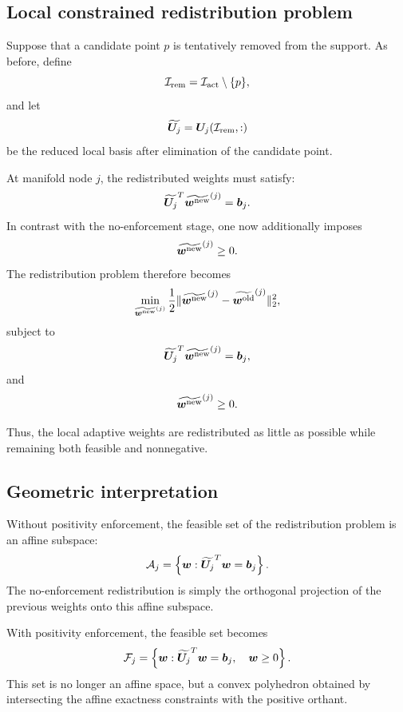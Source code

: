 \documentclass[11pt,a4paper]{article}
\begin{document}
\subsection{Local constrained redistribution problem}

Suppose that a candidate point $p$ is tentatively removed from the support. As
before, define
\[
        \mathcal{I}_{\mathrm{rem}}=\mathcal{I}_{\mathrm{act}}\setminus\{p\},
\]
and let
\[
        \widetilde{\bm U_j}
        =
        \bm U_j(\mathcal{I}_{\mathrm{rem}},:)
\]
be the reduced local basis after elimination of the candidate point.

At manifold node $j$, the redistributed weights must satisfy:
\[
        {\widetilde{\bm U_j}}^T
        \widetilde{\bm w^{\mathrm{new}}}^{(j)}
        =
        \bm b_j.
        \label{eq:local_positive_exactness}
\]
In contrast with the no-enforcement stage, one now additionally imposes
\[
        \widetilde{\bm w^{\mathrm{new}}}^{(j)}\geq 0.
        \label{eq:local_positive_inequality}
\]
The redistribution problem therefore becomes
\[
        \min_{\widetilde{\bm w^{\mathrm{new}}}^{(j)}}
        \frac{1}{2}
        \|
        \widetilde{\bm w^{\mathrm{new}}}^{(j)}
        -
        \widetilde{\bm w^{\mathrm{old}}}^{(j)}
        \|_2^2,
\]
subject to
\[
        {\widetilde{\bm U_j}}^T
        \widetilde{\bm w^{\mathrm{new}}}^{(j)}
        =
        \bm b_j,
\]
and
\[
        \widetilde{\bm w^{\mathrm{new}}}^{(j)}\geq 0.
        \label{eq:local_positive_problem}
\]

Thus, the local adaptive weights are redistributed as little as possible while
remaining both feasible and nonnegative.

\subsection{Geometric interpretation}

Without positivity enforcement, the feasible set of the redistribution problem
is an affine subspace:
\[
        \mathcal{A}_j
        =
        \left\{
        \bm w:
        {\widetilde{\bm U_j}}^T\bm w=\bm b_j
        \right\}.
\]
The no-enforcement redistribution is simply the orthogonal projection of the
previous weights onto this affine subspace.

With positivity enforcement, the feasible set becomes
\[
        \mathcal{F}_j
        =
        \left\{
        \bm w:
        {\widetilde{\bm U_j}}^T\bm w=\bm b_j,
        \quad
        \bm w\geq 0
        \right\}.
\]
This set is no longer an affine space, but a convex polyhedron obtained by
intersecting the affine exactness constraints with the positive orthant.
\end{document}
